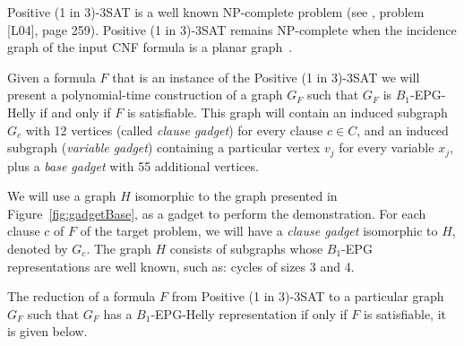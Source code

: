 \documentclass[preprint,12pt]{elsarticle} %
\begin{document}


{\sc Positive (1 in 3)-3SAT } is a well known NP-complete problem (see \citep{johnson1979}, problem [L04], page 259). {\sc Positive (1 in 3)-3SAT} remains NP-complete when the incidence graph of the input CNF formula is a planar graph~\citep{mulzer2008minimum}.

Given a formula $F$ that is an instance of the {\sc Positive (1 in 3)-3SAT} we will present a polynomial-time construction of a graph $ G_F$ such that $ G_F $ is $ B_1$-EPG-Helly if and only if $ F $ is satisfiable. This graph will contain an induced subgraph $ G_c$ with 12 vertices (called \emph {clause gadget}) for every clause $ c \in C $, and an induced subgraph (\emph {variable gadget}) containing a particular vertex  $ v_j$ for every variable $ x_j$, plus a \emph{base gadget}  with 55 additional vertices.

We will use a graph $H$ isomorphic to the graph presented in Figure~\ref{fig:gadgetBase}, as a gadget to perform the demonstration. For each clause $c$ of $F$ of the target problem, we will have a \emph{clause gadget} isomorphic to $H$, denoted by $G_c$. The graph $H$ consists of subgraphs whose $B_1$-EPG representations are well known, such as: cycles of sizes 3 and 4.

 


The reduction of a formula $F$ from  {\sc Positive (1 in 3)-3SAT}  to a particular graph $G_F$ such that $G_F$ has a $B_{1}$-EPG-Helly representation if only if $F$ is satisfiable, it is given below.
\end{document}
